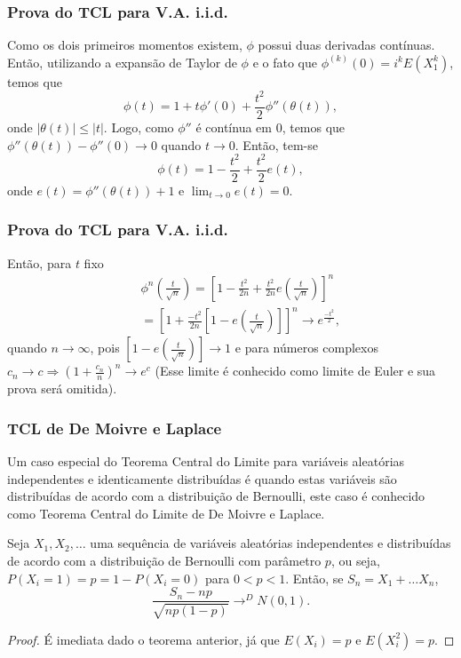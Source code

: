 \begin{frame}
\frametitle{\textbf{Prova do TCL para V.A. i.i.d.}}
\baselineskip=13pt
\begin{block}{}


Como os dois primeiros momentos existem, $\phi$ possui duas
derivadas contínuas. Então, utilizando a expansão de Taylor de
$\phi$ e o fato que $\phi^{(k)}(0)=i^kE(X_1^k)$, temos que
$$
\phi(t)=1+t\phi'(0)+\frac{t^2}{2}\phi''(\theta(t)),$$ onde
$|\theta(t)|\leq |t|$. Logo, como $\phi''$ é contínua em 0, temos
que $\phi''(\theta(t))-\phi''(0)\rightarrow 0$ quando $t\rightarrow
0$. Então, tem-se
$$\phi(t)=1-\frac{t^2}{2}+\frac{t^2}{2}e(t),$$
onde $e(t)=\phi''(\theta(t))+1$ e $\lim_{t\rightarrow 0}e(t)=0$.

\end{block}
\end{frame}

\begin{frame}
\frametitle{\textbf{Prova do TCL para V.A. i.i.d.}}
\baselineskip=13pt
\begin{block}{}


Então, para $t$ fixo
\begin{eqnarray}
& & \phi^n(\frac{t}{\sqrt{n}})=[1-\frac{t^2}{2n}+\frac{t^2}{2n}e(\frac{t}{\sqrt{n}})]^n\nonumber\\
&  &=
[1+\frac{-t^2}{2n}[1-e(\frac{t}{\sqrt{n}})]]^n\rightarrow
e^{\frac{-t^2}{2}},\nonumber
\end{eqnarray}
quando $n\rightarrow\infty$, pois
$[1-e(\frac{t}{\sqrt{n}})]\rightarrow 1$ e para números complexos
$c_n\rightarrow c\Rightarrow (1+\frac{c_n}{n})^n\rightarrow e^c$
(Esse limite é conhecido como limite de Euler e sua prova será
omitida).

\end{block}
\end{frame}

\begin{frame}
\frametitle{\textbf{TCL de
De Moivre e Laplace}}


Um caso especial do Teorema Central do Limite para variáveis
aleatórias independentes e identicamente distribuídas é quando estas
variáveis são distribuídas de acordo com a distribuição de
Bernoulli, este caso é conhecido como Teorema Central do Limite de
De Moivre e Laplace.

\begin{corol}
Seja $X_1,X_2,\ldots$ uma sequência de variáveis aleatórias
independentes e distribuídas de acordo com a distribuição de
Bernoulli com parâmetro $p$, ou seja, $P(X_i=1)=p=1-P(X_i=0)$ para
$0<p<1$. Então, se $S_n=X_1+\ldots X_n$,
$$\frac{S_n-np}{\sqrt{np(1-p)}}\rightarrow^D N(0,1).$$
\end{corol}

\begin{proof} É imediata dado o teorema anterior, já que $E(X_i)=p$ e
$E(X_i^2)=p$. \end{proof}


\end{frame}

